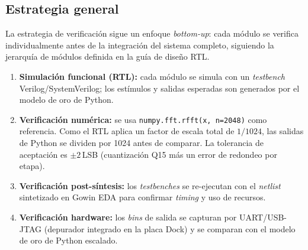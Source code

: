 \documentclass[11pt,a4paper]{article}
\begin{document}
\subsection{Estrategia general}
La estrategia de verificación sigue un enfoque \emph{bottom-up}: cada módulo se
verifica individualmente antes de la integración del sistema completo, siguiendo
la jerarquía de módulos definida en la guía de diseño RTL.
\begin{enumerate}[leftmargin=1.6em]
  \item \textbf{Simulación funcional (RTL):} cada módulo se simula con un
    \emph{testbench} Verilog/SystemVerilog; los estímulos y salidas esperadas son
    generados por el modelo de oro de Python.
  \item \textbf{Verificación numérica:} se usa \texttt{numpy.fft.rfft(x, n=2048)}
    como referencia. Como el RTL aplica un factor de escala total de $1/1024$, las
    salidas de Python se dividen por 1024 antes de comparar. La tolerancia de
    aceptación es $\pm2$\,LSB (cuantización Q15 más un error de redondeo por
    etapa).
  \item \textbf{Verificación post-síntesis:} los \emph{testbenches} se re-ejecutan
    con el \emph{netlist} sintetizado en Gowin EDA para confirmar \emph{timing} y
    uso de recursos.
  \item \textbf{Verificación hardware:} los \emph{bins} de salida se capturan por
    UART/USB-JTAG (depurador integrado en la placa Dock) y se comparan con el
    modelo de oro de Python escalado.
\end{enumerate}
\end{document}
